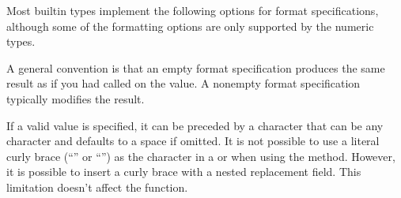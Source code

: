 \documentclass[letterpaper,10pt,english]{sphinxmanual}
\begin{document}
Most built\sphinxhyphen{}in types implement the following options for format specifications,
although some of the formatting options are only supported by the numeric types.

A general convention is that an empty format specification produces
the same result as if you had called  on the value. A
non\sphinxhyphen{}empty format specification typically modifies the result.

If a valid  value is specified, it can be preceded by a 
character that can be any character and defaults to a space if omitted.
It is not possible to use a literal curly brace (“\sphinxcode{\sphinxupquote{\{}}” or “\sphinxcode{\sphinxupquote{\}}}”) as
the  character in a  or when using the 
method.  However, it is possible to insert a curly brace
with a nested replacement field.  This limitation doesn’t
affect the  function.
\end{document}
